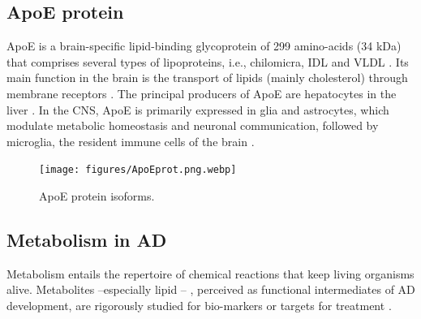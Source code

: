 \documentclass{amsart}
\theoremstyle{plain}
\begin{document}
\subsection{ApoE protein}
ApoE is a brain-specific lipid-binding glycoprotein of 299 amino-acids (34 kDa) that comprises several types of lipoproteins, i.e., chilomicra, IDL and VLDL \cite{Husain2021APOETherapeutics}. Its main function in the brain is the transport of lipids (mainly cholesterol) through membrane receptors \cite{Yang2023ApolipoproteinDisease}. The principal producers of ApoE are hepatocytes in the liver \cite{Mahley2016CentralMetabolism}. In the CNS, ApoE is primarily expressed in glia and astrocytes, which modulate metabolic homeostasis and neuronal communication, followed by microglia, the resident immune cells of the brain \cite{Lanfranco2021ExpressionInflammation}.

\begin{figure}[]
  \texttt{[image: figures/ApoEprot.png.webp]}
    \caption{ApoE protein isoforms.}
  \label{fig2}
\end{figure}

\subsection{Metabolism in AD}

Metabolism entails the repertoire of chemical reactions that keep living organisms alive. Metabolites  --especially lipid \cite{Barupal2019SetsPathophysiology,Fernandez-Calle2022APOEDiseases, Proitsi2017AssociationAnalysis}-- , perceived as functional intermediates of AD development, are rigorously studied for bio-markers or targets for treatment \cite{Oeckl2019ADisease}.
\end{document}
